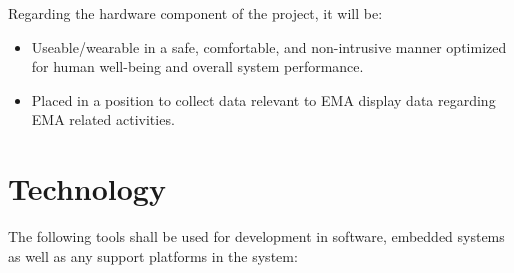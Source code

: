 \documentclass[12pt]{article}
\begin{document}
Regarding the hardware component of the project, it will be:\\

\begin{itemize}
\item Useable/wearable in a safe, comfortable, and non-intrusive manner optimized for human well-being and overall system performance.
\item Placed in a position to collect data relevant to EMA display data regarding EMA related activities.
\end{itemize}

\section{Technology}
The following tools shall be used for development in software, embedded systems as well as any support platforms in the system:
\end{document}
